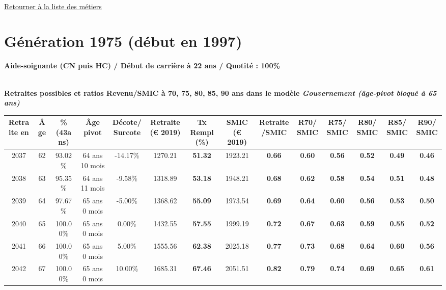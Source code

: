 ~\\ 
 
 \hyperlink{page.2}{\noindent Retourner à la liste des métiers}

 \newpage 

\section{Génération 1975 (début en 1997)\label{AideSoignant_100_22_1975_0}} 
 
{\bf \noindent Aide-soignante (CN puis HC) / Début de carrière à 22 ans / Quotité : 100\%}  ~ 

 ~\\{\bf \noindent Retraites possibles et ratios Revenu/SMIC à 70, 75, 80, 85, 90 ans dans le modèle \emph{Gouvernement (âge-pivot bloqué à 65 ans)}}  
 
\begin{adjustbox}{max width=\textwidth} 
\begin{tabular}[htb]{|c|c||c|c|c||c|c||c|c||c|c|c|c|c|} 
\hline 
 Retraite en &  Âge &  \%(43ans) &  Âge pivot &  Décote/Surcote &  Retraite (\euro{} 2019) &  Tx Rempl(\%) &  SMIC (\euro{} 2019) &  Retraite/SMIC &  R70/SMIC &  R75/SMIC &  R80/SMIC &  R85/SMIC &  R90/SMIC \\ 
\hline \hline 
 2037 &  62 &  93.02\% &  64 ans 10 mois &  -14.17\% &  1270.21 &  {\bf 51.32} &  1923.21 &  {\bf {\color{red} 0.66}} &  {\bf {\color{red} 0.60}} &  {\bf {\color{red} 0.56}} &  {\bf {\color{red} 0.52}} &  {\bf {\color{red} 0.49}} &  {\bf {\color{red} 0.46}} \\ 
\hline 
 2038 &  63 &  95.35\% &  64 ans 11 mois &  -9.58\% &  1318.89 &  {\bf 53.18} &  1948.21 &  {\bf {\color{red} 0.68}} &  {\bf {\color{red} 0.62}} &  {\bf {\color{red} 0.58}} &  {\bf {\color{red} 0.54}} &  {\bf {\color{red} 0.51}} &  {\bf {\color{red} 0.48}} \\ 
\hline 
 2039 &  64 &  97.67\% &  65 ans 0 mois &  -5.00\% &  1368.62 &  {\bf 55.09} &  1973.54 &  {\bf {\color{red} 0.69}} &  {\bf {\color{red} 0.64}} &  {\bf {\color{red} 0.60}} &  {\bf {\color{red} 0.56}} &  {\bf {\color{red} 0.53}} &  {\bf {\color{red} 0.50}} \\ 
\hline 
 2040 &  65 &  100.00\% &  65 ans 0 mois &  0.00\% &  1432.55 &  {\bf 57.55} &  1999.19 &  {\bf {\color{red} 0.72}} &  {\bf {\color{red} 0.67}} &  {\bf {\color{red} 0.63}} &  {\bf {\color{red} 0.59}} &  {\bf {\color{red} 0.55}} &  {\bf {\color{red} 0.52}} \\ 
\hline 
 2041 &  66 &  100.00\% &  65 ans 0 mois &  5.00\% &  1555.56 &  {\bf 62.38} &  2025.18 &  {\bf {\color{red} 0.77}} &  {\bf {\color{red} 0.73}} &  {\bf {\color{red} 0.68}} &  {\bf {\color{red} 0.64}} &  {\bf {\color{red} 0.60}} &  {\bf {\color{red} 0.56}} \\ 
\hline 
 2042 &  67 &  100.00\% &  65 ans 0 mois &  10.00\% &  1685.31 &  {\bf 67.46} &  2051.51 &  {\bf {\color{red} 0.82}} &  {\bf {\color{red} 0.79}} &  {\bf {\color{red} 0.74}} &  {\bf {\color{red} 0.69}} &  {\bf {\color{red} 0.65}} &  {\bf {\color{red} 0.61}} \\ 
\hline 
\hline 
\end{tabular} 
\end{adjustbox} 
 
